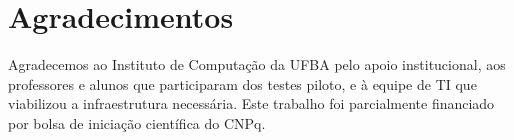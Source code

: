 \documentclass[portuguese]{sbc2025}%
\begin{document}
\section*{Agradecimentos}

Agradecemos ao Instituto de Computação da UFBA pelo apoio institucional, aos professores e alunos que participaram dos testes piloto, e à equipe de TI que viabilizou a infraestrutura necessária. Este trabalho foi parcialmente financiado por bolsa de iniciação científica do CNPq.



\end{document}
